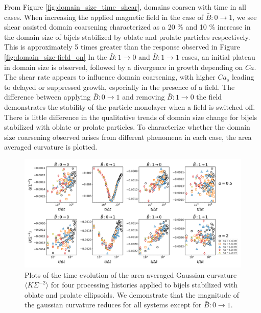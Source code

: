 From Figure \ref{fig:domain_size_time_shear}, domains coarsen with time in all cases. When increasing the applied magnetic field in the case of 
$\bar{B}:0 \rightarrow 1$, we see shear assisted domain coarsening characterized as a 20 \% and 10 \% increase in the domain size of bijels
stabilized by oblate and prolate particles respectively. This is approximately 5 times greater than the response observed in Figure \ref{fig:domain_size-field_on}
In the  $\bar{B}: 1 \to 0$ and $\bar{B}: 1 \to 1$ cases, an initial plateau in domain size is observed, followed by a divergence in 
growth depending on $Ca$. The shear rate appears to influence domain coarsening, with higher $Ca_s$ leading to delayed or 
suppressed growth, especially in the presence of a field. The difference between applying $\bar{B}: 0 \to 1$ and 
removing $\bar{B}: 1 \to 0$ the field demonstrates the stability of the particle monolayer when a field is switched off.
There is little difference in the qualitative trends of domain size change for bijels stabilized with oblate or prolate particles.
To characterize whether the domain size coarsening observed arises from different phenomena in each case, the area averaged curvature is plotted.

\begin{figure} 
    \centering 
    \includegraphics[scale=0.3]{../figures/results/paper3/gaussian-time_compare.png} 
    \caption{Plots of the time evolution of the area averaged Gaussian curvature $\langle K \Sigma^{-2} \rangle$ for four 
             processing histories applied to bijels stabilized with oblate and prolate ellipsoids. We demonstrate that the 
             magnitude of the gaussian curvature reduces for all systems except for $\bar{B}: 0 \to 1$.} 
    \label{fig:gaussian_curvature_time_shear} 
\end{figure}

